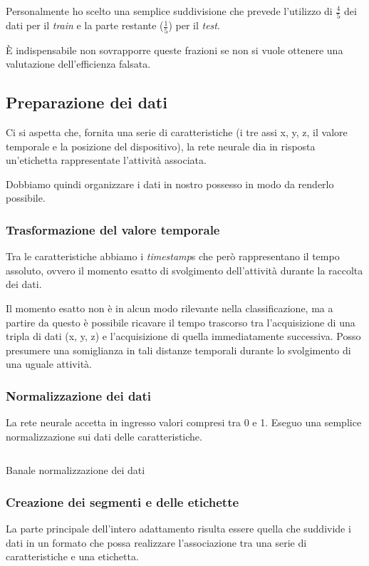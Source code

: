 Personalmente ho scelto una semplice suddivisione che prevede l'utilizzo di $\frac{4}{5}$ dei dati per il \textit{train} e 
la parte restante ($\frac{1}{5}$) per il \textit{test}.

È indispensabile non sovrapporre queste frazioni se non si vuole ottenere una valutazione dell'efficienza falsata.

\subsection{Preparazione dei dati}
Ci si aspetta che, fornita una serie di caratteristiche (i tre assi x, y, z, il valore temporale e 
la posizione del dispositivo), la rete neurale dia in risposta un'etichetta rappresentate l'attività associata.

Dobbiamo quindi organizzare i dati in nostro possesso in modo da renderlo possibile.

\subsubsection{Trasformazione del valore temporale}
Tra le caratteristiche abbiamo i \textit{timestamp}s che però rappresentano il tempo assoluto, 
ovvero il momento esatto di svolgimento dell'attività durante la raccolta dei dati.

Il momento esatto non è in alcun modo rilevante nella classificazione, ma a partire da questo è possibile ricavare il tempo trascorso 
tra l'acquisizione di una tripla di dati (x, y, z) e l'acquisizione di quella immediatamente successiva.
Posso presumere una somiglianza in tali distanze temporali durante lo svolgimento di una uguale attività.

\subsubsection{Normalizzazione dei dati}
La rete neurale accetta in ingresso valori compresi tra 0 e 1. Eseguo una semplice normalizzazione sui dati delle caratteristiche.
\begin{listing}[H] 
    \inputminted[frame=single,framesep=10pt]{python}{snippets/normalize_data.py}
    \caption{Banale normalizzazione dei dati}
\end{listing}

\subsubsection{Creazione dei segmenti e delle etichette}
La parte principale dell'intero adattamento risulta essere quella che suddivide i dati in un formato che possa 
realizzare l'associazione tra una serie di caratteristiche e una etichetta.

